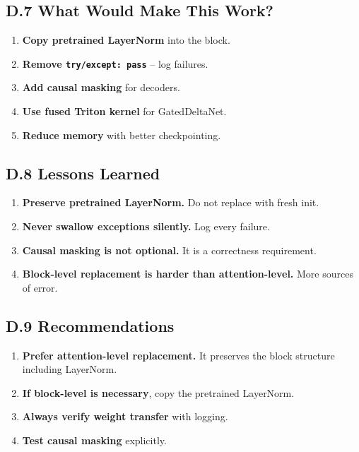\subsection{D.7 What Would Make This Work?}

\begin{enumerate}
\item \textbf{Copy pretrained LayerNorm} into the block.
\item \textbf{Remove \texttt{try/except: pass}} -- log failures.
\item \textbf{Add causal masking} for decoders.
\item \textbf{Use fused Triton kernel} for GatedDeltaNet.
\item \textbf{Reduce memory} with better checkpointing.

\end{enumerate}
\subsection{D.8 Lessons Learned}

\begin{enumerate}
\item \textbf{Preserve pretrained LayerNorm.} Do not replace with fresh init.
\item \textbf{Never swallow exceptions silently.} Log every failure.
\item \textbf{Causal masking is not optional.} It is a correctness requirement.
\item \textbf{Block-level replacement is harder than attention-level.} More sources
  of error.

\end{enumerate}
\subsection{D.9 Recommendations}

\begin{enumerate}
\item \textbf{Prefer attention-level replacement.} It preserves the block structure
  including LayerNorm.
\item \textbf{If block-level is necessary}, copy the pretrained LayerNorm.
\item \textbf{Always verify weight transfer} with logging.
\item \textbf{Test causal masking} explicitly.

\end{enumerate}



